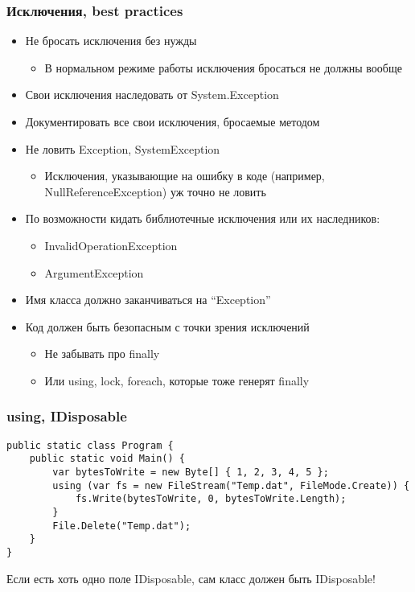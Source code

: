 \documentclass[xetex,mathserif,serif]{beamer}
\begin{document}
    \begin{frame}
        \frametitle{Исключения, best practices}
        \begin{itemize}
            \item Не бросать исключения без нужды
            \begin{itemize}
                \item В нормальном режиме работы исключения бросаться не должны вообще
            \end{itemize}
            \item Свои исключения наследовать от System.Exception
            \item Документировать все свои исключения, бросаемые методом
            \item Не ловить Exception, SystemException
            \begin{itemize}
                \item Исключения, указывающие на ошибку в коде (например, NullReferenceException) уж точно не ловить
            \end{itemize}
            \item По возможности кидать библиотечные исключения или их наследников:
            \begin{itemize}
                \item InvalidOperationException
                \item ArgumentException
            \end{itemize}
            \item Имя класса должно заканчиваться на ``Exception''
            \item Код должен быть безопасным с точки зрения исключений
            \begin{itemize}
                \item Не забывать про finally 
                \item Или using, lock, foreach, которые тоже генерят finally
            \end{itemize}
        \end{itemize}
    \end{frame}

    \begin{frame}[fragile]
        \frametitle{using, IDisposable}
        \begin{small}
            \begin{verbatim}
public static class Program {
    public static void Main() {
        var bytesToWrite = new Byte[] { 1, 2, 3, 4, 5 };
        using (var fs = new FileStream("Temp.dat", FileMode.Create)) {
            fs.Write(bytesToWrite, 0, bytesToWrite.Length);
        }
        File.Delete("Temp.dat");
    }
}
            \end{verbatim}
        \end{small}
        Если есть хоть одно поле IDisposable, сам класс должен быть IDisposable!
    \end{frame}
\end{document}
